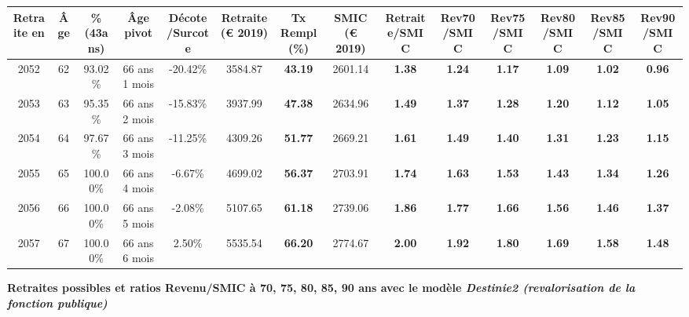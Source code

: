 \begin{adjustbox}{max width=\textwidth} 
\begin{tabular}[htb]{|c|c||c|c|c||c|c||c||c|c|c|c|c|c|} 
\hline 
 Retraite en &  Âge &  \%(43ans) &  Âge pivot &  Décote/Surcote &  Retraite (\euro{} 2019) &  Tx Rempl(\%) &  SMIC (\euro{} 2019) &  Retraite/SMIC &  Rev70/SMIC &  Rev75/SMIC &  Rev80/SMIC &  Rev85/SMIC &  Rev90/SMIC \\ 
\hline \hline 
 2052 &  62 &  93.02\% &  66 ans 1 mois &  -20.42\% &  3584.87 &  {\bf 43.19} &  2601.14 &  {\bf 1.38} &  {\bf 1.24} &  {\bf 1.17} &  {\bf 1.09} &  {\bf 1.02} &  {\bf {\color{red} 0.96}} \\ 
\hline 
 2053 &  63 &  95.35\% &  66 ans 2 mois &  -15.83\% &  3937.99 &  {\bf 47.38} &  2634.96 &  {\bf 1.49} &  {\bf 1.37} &  {\bf 1.28} &  {\bf 1.20} &  {\bf 1.12} &  {\bf 1.05} \\ 
\hline 
 2054 &  64 &  97.67\% &  66 ans 3 mois &  -11.25\% &  4309.26 &  {\bf 51.77} &  2669.21 &  {\bf 1.61} &  {\bf 1.49} &  {\bf 1.40} &  {\bf 1.31} &  {\bf 1.23} &  {\bf 1.15} \\ 
\hline 
 2055 &  65 &  100.00\% &  66 ans 4 mois &  -6.67\% &  4699.02 &  {\bf 56.37} &  2703.91 &  {\bf 1.74} &  {\bf 1.63} &  {\bf 1.53} &  {\bf 1.43} &  {\bf 1.34} &  {\bf 1.26} \\ 
\hline 
 2056 &  66 &  100.00\% &  66 ans 5 mois &  -2.08\% &  5107.65 &  {\bf 61.18} &  2739.06 &  {\bf 1.86} &  {\bf 1.77} &  {\bf 1.66} &  {\bf 1.56} &  {\bf 1.46} &  {\bf 1.37} \\ 
\hline 
 2057 &  67 &  100.00\% &  66 ans 6 mois &  2.50\% &  5535.54 &  {\bf 66.20} &  2774.67 &  {\bf 2.00} &  {\bf 1.92} &  {\bf 1.80} &  {\bf 1.69} &  {\bf 1.58} &  {\bf 1.48} \\ 
\hline 
\hline 
\end{tabular} 
\end{adjustbox} 
 
 \vspace{0.1cm} 
{\bf \noindent Retraites possibles et ratios Revenu/SMIC à 70, 75, 80, 85, 90 ans avec le modèle \emph{Destinie2 (revalorisation de la fonction publique)}}  
 
